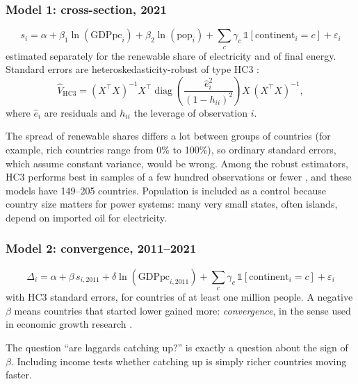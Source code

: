 \documentclass[11pt,a4paper]{article}
\begin{document}
\subsubsection{Model 1: cross-section, 2021}
\begin{equation}
s_i = \alpha + \beta_1 \ln(\text{GDPpc}_i) + \beta_2 \ln(\text{pop}_i) + \textstyle\sum_c \gamma_c\,\mathbb{1}[\text{continent}_i = c] + \varepsilon_i
\end{equation}
estimated separately for the renewable share of electricity and of final energy. Standard errors are heteroskedasticity-robust of type HC3 \citep{mackinnon1985}:
\begin{equation}
\widehat{V}_{\text{HC3}} = (X^\top X)^{-1} X^\top \operatorname{diag}\!\left(\frac{\hat e_i^{2}}{(1-h_{ii})^{2}}\right) X\,(X^\top X)^{-1},
\end{equation}
where $\hat e_i$ are residuals and $h_{ii}$ the leverage of observation $i$.

\begin{why}
The spread of renewable shares differs a lot between groups of countries (for example, rich countries range from 0\% to 100\%), so ordinary standard errors, which assume constant variance, would be wrong. Among the robust estimators, HC3 performs best in samples of a few hundred observations or fewer \citep{long2000}, and these models have 149--205 countries. Population is included as a control because country size matters for power systems: many very small states, often islands, depend on imported oil for electricity.
\end{why}

\subsubsection{Model 2: convergence, 2011--2021}
\begin{equation}
\Delta_i = \alpha + \beta\, s_{i,2011} + \delta \ln(\text{GDPpc}_{i,2011}) + \textstyle\sum_c \gamma_c\,\mathbb{1}[\text{continent}_i = c] + \varepsilon_i
\end{equation}
with HC3 standard errors, for countries of at least one million people. A negative $\beta$ means countries that started lower gained more: \emph{convergence}, in the sense used in economic growth research \citep{barro1992}.

\begin{why}
The question ``are laggards catching up?'' is exactly a question about the sign of $\beta$. Including income tests whether catching up is simply richer countries moving faster.
\end{why}
\end{document}
